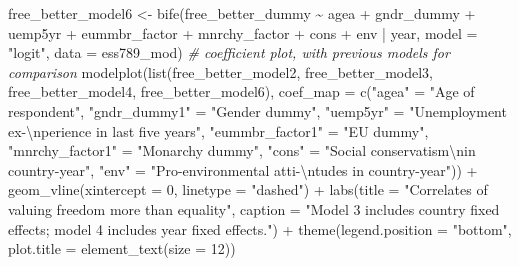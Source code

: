 \documentclass[
]{article}
\newenvironment{Shaded}{\begin{snugshade}}{\end{snugshade}}
\newcommand{\AttributeTok}[1]{\textcolor[rgb]{0.77,0.63,0.00}{#1}}
\newcommand{\CommentTok}[1]{\textcolor[rgb]{0.56,0.35,0.01}{\textit{#1}}}
\newcommand{\DecValTok}[1]{\textcolor[rgb]{0.00,0.00,0.81}{#1}}
\newcommand{\FunctionTok}[1]{\textcolor[rgb]{0.00,0.00,0.00}{#1}}
\newcommand{\NormalTok}[1]{#1}
\newcommand{\OtherTok}[1]{\textcolor[rgb]{0.56,0.35,0.01}{#1}}
\newcommand{\SpecialCharTok}[1]{\textcolor[rgb]{0.00,0.00,0.00}{#1}}
\newcommand{\StringTok}[1]{\textcolor[rgb]{0.31,0.60,0.02}{#1}}
\begin{document}
\begin{Shaded}
\begin{Highlighting}[]
\NormalTok{free\_better\_model6 }\OtherTok{\textless{}{-}} \FunctionTok{bife}\NormalTok{(free\_better\_dummy }\SpecialCharTok{\textasciitilde{}}\NormalTok{ agea }\SpecialCharTok{+}\NormalTok{ gndr\_dummy }\SpecialCharTok{+}\NormalTok{ uemp5yr }\SpecialCharTok{+}\NormalTok{ eummbr\_factor }\SpecialCharTok{+}\NormalTok{ mnrchy\_factor }\SpecialCharTok{+}\NormalTok{ cons }\SpecialCharTok{+}\NormalTok{ env }\SpecialCharTok{|}\NormalTok{ year, }
           \AttributeTok{model =} \StringTok{"logit"}\NormalTok{, }\AttributeTok{data =}\NormalTok{ ess789\_mod)}
\CommentTok{\# coefficient plot, with previous models for comparison  }
\FunctionTok{modelplot}\NormalTok{(}\FunctionTok{list}\NormalTok{(free\_better\_model2, free\_better\_model3, }
\NormalTok{               free\_better\_model4, free\_better\_model6),}
          \AttributeTok{coef\_map =} \FunctionTok{c}\NormalTok{(}\StringTok{"agea"} \OtherTok{=} \StringTok{"Age of respondent"}\NormalTok{,}
                       \StringTok{"gndr\_dummy1"} \OtherTok{=} \StringTok{"Gender dummy"}\NormalTok{, }
                       \StringTok{"uemp5yr"} \OtherTok{=} \StringTok{"Unemployment ex{-}}\SpecialCharTok{\textbackslash{}n}\StringTok{perience in last five years"}\NormalTok{,}
                       \StringTok{"eummbr\_factor1"} \OtherTok{=} \StringTok{"EU dummy"}\NormalTok{, }
                       \StringTok{"mnrchy\_factor1"} \OtherTok{=} \StringTok{"Monarchy dummy"}\NormalTok{,}
                       \StringTok{"cons"} \OtherTok{=} \StringTok{"Social conservatism}\SpecialCharTok{\textbackslash{}n}\StringTok{in country{-}year"}\NormalTok{, }
                       \StringTok{"env"} \OtherTok{=} \StringTok{"Pro{-}environmental atti{-}}\SpecialCharTok{\textbackslash{}n}\StringTok{tudes in country{-}year"}\NormalTok{)) }\SpecialCharTok{+}
  \FunctionTok{geom\_vline}\NormalTok{(}\AttributeTok{xintercept =} \DecValTok{0}\NormalTok{, }\AttributeTok{linetype =} \StringTok{"dashed"}\NormalTok{) }\SpecialCharTok{+}
  \FunctionTok{labs}\NormalTok{(}\AttributeTok{title =} \StringTok{"Correlates of valuing freedom more than equality"}\NormalTok{, }
       \AttributeTok{caption =} \StringTok{"Model 3 includes country fixed effects; model 4 includes year fixed effects."}\NormalTok{) }\SpecialCharTok{+}
  \FunctionTok{theme}\NormalTok{(}\AttributeTok{legend.position =} \StringTok{"bottom"}\NormalTok{, }
        \AttributeTok{plot.title =} \FunctionTok{element\_text}\NormalTok{(}\AttributeTok{size =} \DecValTok{12}\NormalTok{))}
\end{Highlighting}
\end{Shaded}
\end{document}
